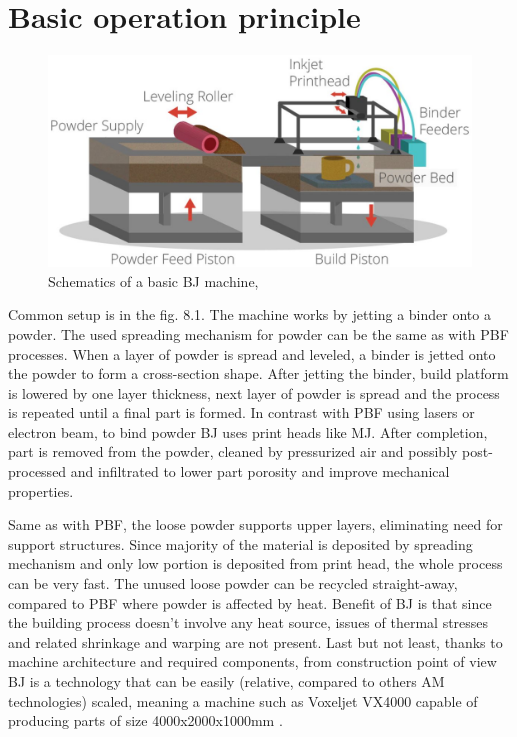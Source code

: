\documentclass[a4paper, 11pt, reqno]{report}
\begin{document}
\section{Basic operation principle}
\begin{figure}[b!]
	\centering
	\includegraphics[scale=0.65]{BJthreeding}
	\caption{Schematics of a basic BJ machine, \cite{threeding}}
\end{figure}

Common setup is in the fig. 8.1. The machine works by jetting a binder onto a powder. The used spreading mechanism for powder can be the same as with PBF processes. When a layer of powder is spread and leveled, a binder is jetted onto the powder to form a cross-section shape. After jetting the binder, build platform is lowered by one layer thickness, next layer of powder is spread and the process is repeated until a final part is formed. In contrast with PBF using lasers or electron beam, to bind powder BJ uses print heads like MJ. After completion, part is removed from the powder, cleaned by pressurized air and possibly post-processed and infiltrated to lower part porosity and improve mechanical properties.

	Same as with PBF, the loose powder supports upper layers, eliminating need for support structures. Since majority of the material is deposited by spreading mechanism and only low portion is deposited from print head, the whole process can be very fast. The unused loose powder can be recycled straight-away, compared to PBF where powder is affected by heat. Benefit of BJ is that since the building process doesn't involve any heat source, issues of thermal stresses and related shrinkage and warping are not present. Last but not least, thanks to machine architecture and required components, from construction point of view BJ is a technology that can be easily (relative, compared to others AM technologies) scaled, meaning a machine such as Voxeljet VX4000 capable of producing parts of size 4000x2000x1000mm \cite{voxeljet}.
\end{document}
